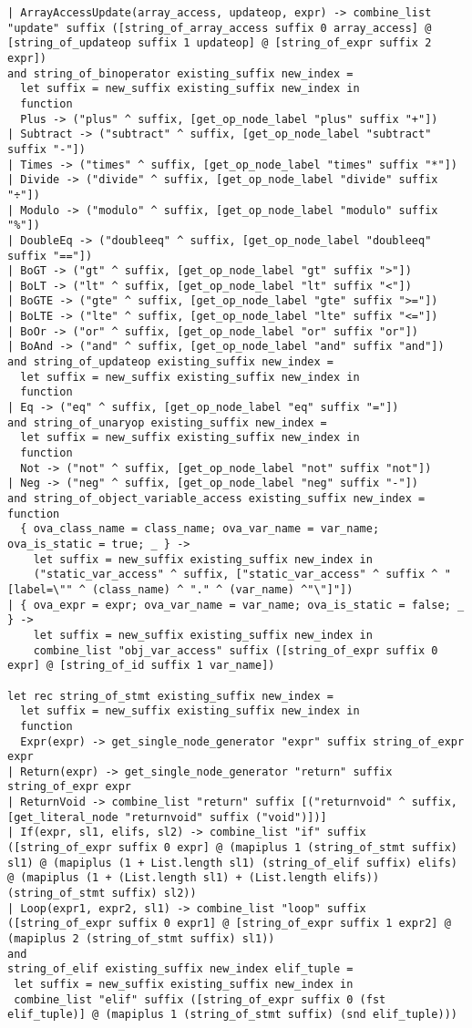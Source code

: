 \documentclass{article}
\begin{document}
\begin{verbatim}
| ArrayAccessUpdate(array_access, updateop, expr) -> combine_list "update" suffix ([string_of_array_access suffix 0 array_access] @ [string_of_updateop suffix 1 updateop] @ [string_of_expr suffix 2 expr])
and string_of_binoperator existing_suffix new_index =
  let suffix = new_suffix existing_suffix new_index in
  function
  Plus -> ("plus" ^ suffix, [get_op_node_label "plus" suffix "+"])
| Subtract -> ("subtract" ^ suffix, [get_op_node_label "subtract" suffix "-"])
| Times -> ("times" ^ suffix, [get_op_node_label "times" suffix "*"])
| Divide -> ("divide" ^ suffix, [get_op_node_label "divide" suffix "÷"])
| Modulo -> ("modulo" ^ suffix, [get_op_node_label "modulo" suffix "%"])
| DoubleEq -> ("doubleeq" ^ suffix, [get_op_node_label "doubleeq" suffix "=="])
| BoGT -> ("gt" ^ suffix, [get_op_node_label "gt" suffix ">"])
| BoLT -> ("lt" ^ suffix, [get_op_node_label "lt" suffix "<"])
| BoGTE -> ("gte" ^ suffix, [get_op_node_label "gte" suffix ">="])
| BoLTE -> ("lte" ^ suffix, [get_op_node_label "lte" suffix "<="])
| BoOr -> ("or" ^ suffix, [get_op_node_label "or" suffix "or"])
| BoAnd -> ("and" ^ suffix, [get_op_node_label "and" suffix "and"])
and string_of_updateop existing_suffix new_index =
  let suffix = new_suffix existing_suffix new_index in
  function
| Eq -> ("eq" ^ suffix, [get_op_node_label "eq" suffix "="])
and string_of_unaryop existing_suffix new_index =
  let suffix = new_suffix existing_suffix new_index in
  function
  Not -> ("not" ^ suffix, [get_op_node_label "not" suffix "not"])
| Neg -> ("neg" ^ suffix, [get_op_node_label "neg" suffix "-"])
and string_of_object_variable_access existing_suffix new_index = function
  { ova_class_name = class_name; ova_var_name = var_name; ova_is_static = true; _ } ->
    let suffix = new_suffix existing_suffix new_index in
    ("static_var_access" ^ suffix, ["static_var_access" ^ suffix ^ " [label=\"" ^ (class_name) ^ "." ^ (var_name) ^"\"]"])
| { ova_expr = expr; ova_var_name = var_name; ova_is_static = false; _ } ->
    let suffix = new_suffix existing_suffix new_index in
    combine_list "obj_var_access" suffix ([string_of_expr suffix 0 expr] @ [string_of_id suffix 1 var_name])

let rec string_of_stmt existing_suffix new_index =
  let suffix = new_suffix existing_suffix new_index in
  function
  Expr(expr) -> get_single_node_generator "expr" suffix string_of_expr expr
| Return(expr) -> get_single_node_generator "return" suffix string_of_expr expr
| ReturnVoid -> combine_list "return" suffix [("returnvoid" ^ suffix, [get_literal_node "returnvoid" suffix ("void")])]
| If(expr, sl1, elifs, sl2) -> combine_list "if" suffix ([string_of_expr suffix 0 expr] @ (mapiplus 1 (string_of_stmt suffix) sl1) @ (mapiplus (1 + List.length sl1) (string_of_elif suffix) elifs) @ (mapiplus (1 + (List.length sl1) + (List.length elifs)) (string_of_stmt suffix) sl2))
| Loop(expr1, expr2, sl1) -> combine_list "loop" suffix ([string_of_expr suffix 0 expr1] @ [string_of_expr suffix 1 expr2] @ (mapiplus 2 (string_of_stmt suffix) sl1))
and
string_of_elif existing_suffix new_index elif_tuple =
 let suffix = new_suffix existing_suffix new_index in
 combine_list "elif" suffix ([string_of_expr suffix 0 (fst elif_tuple)] @ (mapiplus 1 (string_of_stmt suffix) (snd elif_tuple)))


\end{verbatim}
\end{document}
